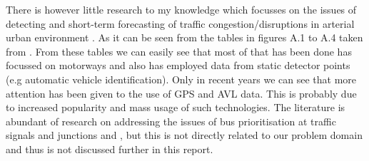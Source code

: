 There is however little research to my knowledge which focusses on the issues of detecting and short-term forecasting of traffic congestion/disruptions in arterial urban environment  \cite{Vlahogianni20143} \cite{5625144}. As it can be seen from the tables in figures A.1 to A.4 taken from \cite{Vlahogianni20143}. From these tables we can easily see that most of that has been done has focussed on motorways and also has employed data from static detector points (e.g automatic vehicle identification). Only in recent years we can see that more attention has been given to the use of GPS and AVL data. This is probably due to increased popularity and mass usage of such technologies. The literature is abundant of research on addressing the issues of bus prioritisation at traffic signals and junctions \cite{eps52676} and \cite{clarke2007}, but this is not directly related to our problem domain and thus is not discussed further in this report.




